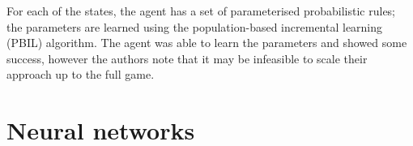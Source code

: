 For each of the states, the agent has a set of parameterised probabilistic rules; the parameters are learned using the population-based incremental learning (PBIL) algorithm.  The agent was able to learn the parameters and showed some success, however the authors note that it may be infeasible to scale their approach up to the full game.

\citet{Sizta2007}

\section{Neural networks}

